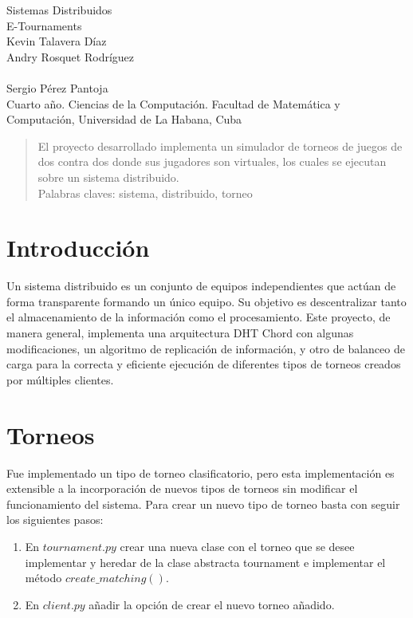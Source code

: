 \documentclass[10pt, a4paper]{article}
\begin{document}
	\begin{center}
		\large{Sistemas Distribuidos} \\
		\huge{E-Tournaments}\\
		\vspace{1em}
		\normalsize Kevin Talavera D\'iaz \\ Andry Rosquet Rodr\'iguez \\ \\ Sergio P\'erez Pantoja\\
		\vspace{1em}
		\small Cuarto a\~no. Ciencias de la Computaci\'on.
		\small Facultad de Matem\'atica y Computaci\'on, Universidad de La Habana, Cuba
	\end{center}

    \begin{abstract}
    	El proyecto desarrollado implementa un simulador de torneos de juegos de dos contra dos donde sus jugadores son virtuales, los cuales se ejecutan sobre un sistema distribuido.\\
    	Palabras claves: sistema, distribuido, torneo 
    \end{abstract}
    \section{Introducci\'on}
    Un sistema distribuido es un conjunto de equipos independientes que act\'uan de forma transparente formando un \'unico equipo. Su objetivo es descentralizar tanto el almacenamiento de la informaci\'on como el procesamiento. Este proyecto, de manera general, implementa una arquitectura DHT Chord con algunas modificaciones, un algoritmo de replicaci\'on de informaci\'on, y otro de balanceo de carga para la correcta y eficiente ejecuci\'on de diferentes tipos de torneos creados por m\'ultiples clientes.
    
    \section{Torneos}
    Fue implementado un tipo de torneo clasificatorio, pero esta implementación es extensible a la incorporación de nuevos tipos de torneos sin modificar el funcionamiento del sistema. Para crear un nuevo tipo de torneo basta con seguir los siguientes pasos:\\
    \begin{enumerate}
    	\item En $tournament.py$ crear una nueva clase con el torneo que se desee implementar y heredar de la clase abstracta tournament e implementar el método $create\_matching()$.\\
    	\item En $client.py$ añadir la opción de crear el nuevo torneo añadido.\\
    \end{enumerate}
    
\end{document}
